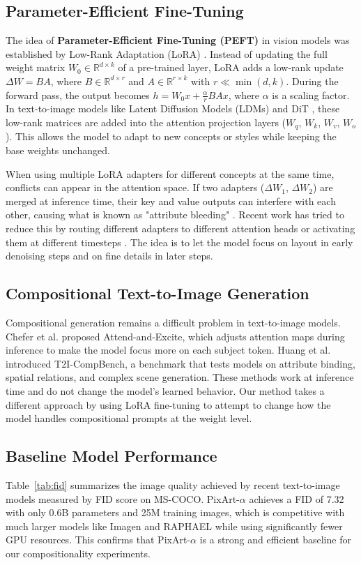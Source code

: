 \documentclass[12pt,onecolumn]{IEEEtran}
\begin{document}
\subsection{Parameter-Efficient Fine-Tuning}
The idea of \textbf{Parameter-Efficient Fine-Tuning (PEFT)} in vision models was established by Low-Rank Adaptation (LoRA) \cite{hu2021lora}. Instead of updating the full weight matrix $W_0 \in \mathbb{R}^{d \times k}$ of a pre-trained layer, LoRA adds a low-rank update $\Delta W = BA$, where $B \in \mathbb{R}^{d \times r}$ and $A \in \mathbb{R}^{r \times k}$ with $r \ll \min(d, k)$. During the forward pass, the output becomes $h = W_0 x + \frac{\alpha}{r} B A x$, where $\alpha$ is a scaling factor. In text-to-image models like Latent Diffusion Models (LDMs) \cite{rombach2022latent} and DiT \cite{peebles2023scalable}, these low-rank matrices are added into the attention projection layers ($W_q$, $W_k$, $W_v$, $W_o$). This allows the model to adapt to new concepts or styles while keeping the base weights unchanged.

When using multiple LoRA adapters for different concepts at the same time, conflicts can appear in the attention space. If two adapters ($\Delta W_1$, $\Delta W_2$) are merged at inference time, their key and value outputs can interfere with each other, causing what is known as "attribute bleeding" \cite{huang2023t2i}. Recent work has tried to reduce this by routing different adapters to different attention heads or activating them at different timesteps \cite{gu2024multilora}. The idea is to let the model focus on layout in early denoising steps and on fine details in later steps.

\subsection{Compositional Text-to-Image Generation}
Compositional generation remains a difficult problem in text-to-image models. Chefer et al. \cite{chefer2023attend} proposed Attend-and-Excite, which adjusts attention maps during inference to make the model focus more on each subject token. Huang et al. \cite{huang2023t2i} introduced T2I-CompBench, a benchmark that tests models on attribute binding, spatial relations, and complex scene generation. These methods work at inference time and do not change the model's learned behavior. Our method takes a different approach by using LoRA fine-tuning
to attempt to change how the model handles compositional prompts at the weight level.

\subsection{Baseline Model Performance}
Table~\ref{tab:fid} summarizes the image quality achieved by recent text-to-image models measured by FID score on MS-COCO. PixArt-$\alpha$ achieves a FID of 7.32 with only 0.6B parameters and 25M training images, which is competitive with much larger models like Imagen and RAPHAEL while using significantly fewer GPU resources. This confirms that PixArt-$\alpha$ is a strong and efficient baseline for our compositionality experiments.
\end{document}
